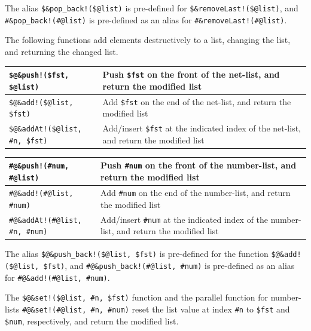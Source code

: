 \documentclass[letterpaper,12pt]{article}
\begin{document}
\vspace{.5cm}

The alias \verb+$&pop_back!($@list)+ is pre-defined for
\verb+$&removeLast!($@list)+, and  \verb+#&pop_back!(#@list)+ is
pre-defined as an alias for \verb+#&removeLast!(#@list)+.

The following functions add elements destructively to a list, changing
the list, and returning the changed list.

\vspace{.5cm}

\noindent
\begin{tabular}{|l|p{6.5cm}|}
\hline
\verb+$@&push!($fst, $@list)+ & Push \verb!$fst! on the front of the net-list, and return the
modified list\\
\hline
\verb+$@&add!($@list, $fst)+ & Add \verb!$fst! on the end of the net-list, and return the modified
list\\
\hline
\verb+$@&addAt!($@list, #n, $fst)+ & Add/insert \verb!$fst! at the indicated index of
the net-list, and return the
modified list\\
\hline
\end{tabular}

\vspace{.5cm}

\noindent
\begin{tabular}{|l|p{6.5cm}|}
\hline
\verb+#@&push!(#num, #@list)+ & Push \verb!#num! on the front of the number-list, and return the
modified list\\
\hline
\verb+#@&add!(#@list, #num)+ & Add \verb!#num! on the end of the number-list, and return the modified
list\\
\hline
\verb+#@&addAt!(#@list, #n, #num)+ & Add/insert \verb!#num! at the indicated index of
the number-list, and return the
modified list\\
\hline
\end{tabular}

\vspace{.5cm}

The alias \verb+$@&push_back!($@list, $fst)+ is pre-defined for the function
\verb+$@&add!($@list, $fst)+, and \verb+#@&push_back!(#@list, #num)+ is pre-defined as an
alias for \verb+#@&add!(#@list, #num)+.

The \verb+$@&set!($@list, #n, $fst)+ function and the parallel function for
number-lists
\verb+#@&set!(#@list, #n, #num)+ reset the list value at index
\verb!#n! to \verb!$fst! and \verb!$num!, respectively, and return the modified list.
\end{document}
